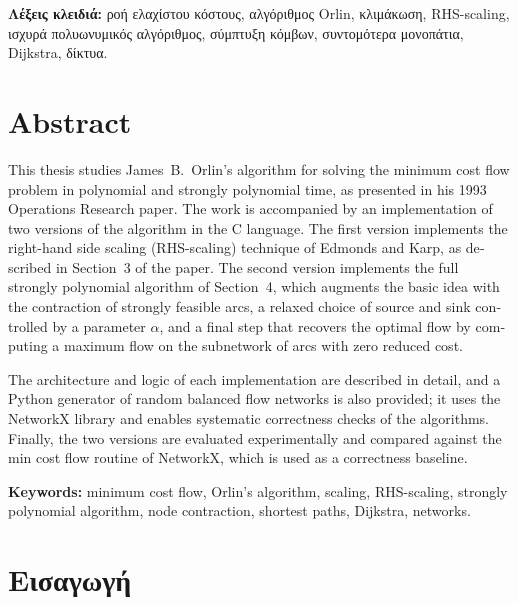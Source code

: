 \documentclass[11pt,a4paper,oneside]{report}
\renewcommand{\headrulewidth}{0pt}
\renewcommand{\footrulewidth}{0pt}
\newcommand{\setmainmatterfooter}{%
  \fancyhf{}%
  \renewcommand{\footrulewidth}{0.4pt}%
  \fancyfoot[R]{\thepage}%
  \fancypagestyle{plain}{\fancyhf{}\renewcommand{\headrulewidth}{0pt}\renewcommand{\footrulewidth}{0.4pt}\fancyfoot[R]{\thepage}}%
}
\begin{document}
\vspace{0.5em}
\textbf{Λέξεις κλειδιά:} ροή ελαχίστου κόστους, αλγόριθμος \textenglish{Orlin}, κλιμάκωση, \textenglish{RHS-scaling}, ισχυρά πολυωνυμικός αλγόριθμος, σύμπτυξη κόμβων, συντομότερα μονοπάτια, \textenglish{Dijkstra}, δίκτυα.

\chapter*{\textenglish{Abstract}}
\begin{english}
This thesis studies James~B.~Orlin's algorithm for solving the minimum cost flow problem in polynomial and strongly polynomial time, as presented in his 1993 Operations Research paper. The work is accompanied by an implementation of two versions of the algorithm in the C language. The first version implements the right-hand side scaling (RHS-scaling) technique of Edmonds and Karp, as described in Section~3 of the paper. The second version implements the full strongly polynomial algorithm of Section~4, which augments the basic idea with the contraction of strongly feasible arcs, a relaxed choice of source and sink controlled by a parameter $\alpha$, and a final step that recovers the optimal flow by computing a maximum flow on the subnetwork of arcs with zero reduced cost.

The architecture and logic of each implementation are described in detail, and a Python generator of random balanced flow networks is also provided; it uses the NetworkX library and enables systematic correctness checks of the algorithms. Finally, the two versions are evaluated experimentally and compared against the min cost flow routine of NetworkX, which is used as a correctness baseline.

\vspace{0.5em}
\textbf{Keywords:} minimum cost flow, Orlin's algorithm, scaling, RHS-scaling, strongly polynomial algorithm, node contraction, shortest paths, Dijkstra, networks.
\end{english}

\tableofcontents

\clearpage
{}
\setmainmatterfooter



\chapter{Εισαγωγή}
\end{document}
